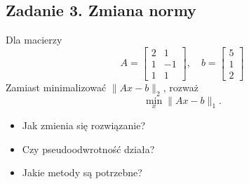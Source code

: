 \documentclass[12pt,a4paper]{article}
\begin{document}
\subsection*{Zadanie 3. Zmiana normy}
Dla macierzy
\[
A=\begin{bmatrix}2 & 1\\ 1 & -1\\ 1 & 1\end{bmatrix},\quad
b=\begin{bmatrix}5\\1\\2\end{bmatrix}
\]
Zamiast minimalizować $\|Ax-b\|_2$, rozważ
\[
\min_x \|Ax-b\|_1.
\]
\begin{itemize}
    \item Jak zmienia się rozwiązanie?
    \item Czy pseudoodwrotność działa?
    \item Jakie metody są potrzebne?
\end{itemize}
\end{document}
